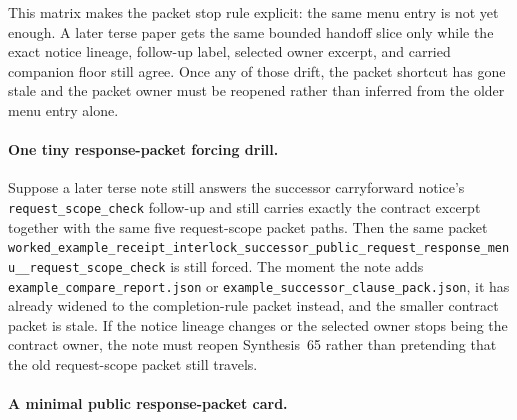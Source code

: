 \documentclass[11pt]{article}
\begin{document}
This matrix makes the packet stop rule explicit: the same menu entry is not yet enough. A later terse paper gets the same bounded handoff slice only while the exact notice lineage, follow-up label, selected owner excerpt, and carried companion floor still agree. Once any of those drift, the packet shortcut has gone stale and the packet owner must be reopened rather than inferred from the older menu entry alone.\cite{series:workedexample}

\paragraph{One tiny response-packet forcing drill.}
Suppose a later terse note still answers the successor carryforward notice's \nolinkurl{request_scope_check} follow-up and still carries exactly the contract excerpt together with the same five request-scope packet paths. Then the same packet \nolinkurl{worked_example_receipt_interlock_successor_public_request_response_menu__request_scope_check} is still forced. The moment the note adds \nolinkurl{example_compare_report.json} or \nolinkurl{example_successor_clause_pack.json}, it has already widened to the completion-rule packet instead, and the smaller contract packet is stale. If the notice lineage changes or the selected owner stops being the contract owner, the note must reopen Synthesis~65 rather than pretending that the old request-scope packet still travels.\cite{series:workedexample}

\paragraph{A minimal public response-packet card.}
\end{document}

